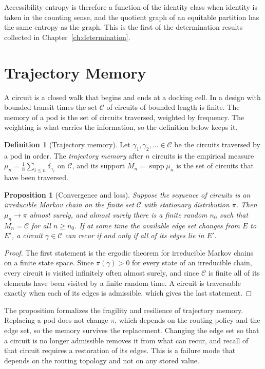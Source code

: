 \documentclass[11pt,openany]{book}
\theoremstyle{plain}
\newtheorem{proposition}[theorem]{Proposition}
\theoremstyle{definition}
\newtheorem{definition}[theorem]{Definition}
\theoremstyle{remark}
\begin{document}
Accessibility entropy is therefore a function of the identity class when identity is taken in the counting sense, and the quotient graph of an equitable partition has the same entropy as the graph. This is the first of the determination results collected in Chapter~\ref{ch:determination}.

\section{Trajectory Memory}

A circuit is a closed walk that begins and ends at a docking cell. In a design with bounded transit times the set $\mathcal C$ of circuits of bounded length is finite. The memory of a pod is the set of circuits traversed, weighted by frequency. The weighting is what carries the information, so the definition below keeps it.

\begin{definition}[Trajectory memory]
Let $\gamma_1,\gamma_2,\dots\in\mathcal C$ be the circuits traversed by a pod in order. The \emph{trajectory memory} after $n$ circuits is the empirical measure $\mu_n=\frac1n\sum_{i\le n}\delta_{\gamma_i}$ on $\mathcal C$, and its support $M_n=\operatorname{supp}\mu_n$ is the set of circuits that have been traversed.
\end{definition}

\begin{proposition}[Convergence and loss]
\label{prop:memory}
Suppose the sequence of circuits is an irreducible Markov chain on the finite set $\mathcal C$ with stationary distribution $\pi$. Then $\mu_n\to\pi$ almost surely, and almost surely there is a finite random $n_0$ such that $M_n=\mathcal C$ for all $n\ge n_0$. If at some time the available edge set changes from $E$ to $E'$, a circuit $\gamma\in\mathcal C$ can recur if and only if all of its edges lie in $E'$.
\end{proposition}
\begin{proof}
The first statement is the ergodic theorem for irreducible Markov chains on a finite state space. Since $\pi(\gamma)>0$ for every state of an irreducible chain, every circuit is visited infinitely often almost surely, and since $\mathcal C$ is finite all of its elements have been visited by a finite random time. A circuit is traversable exactly when each of its edges is admissible, which gives the last statement.
\end{proof}

The proposition formalizes the fragility and resilience of trajectory memory. Replacing a pod does not change $\pi$, which depends on the routing policy and the edge set, so the memory survives the replacement. Changing the edge set so that a circuit is no longer admissible removes it from what can recur, and recall of that circuit requires a restoration of its edges. This is a failure mode that depends on the routing topology and not on any stored value.
\end{document}
